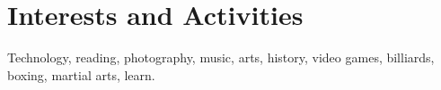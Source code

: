 \documentclass[a4paper,10pt]{article} %
\begin{document}

\section{Interests and Activities}

Technology, reading, photography, music, arts,
history, video games, billiards, boxing, martial arts, learn.

\end{document}
